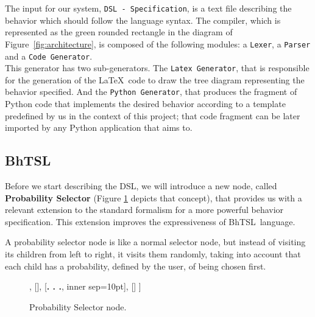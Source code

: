 \documentclass[a4paper,UKenglish,cleveref, autoref, thm-restate]{oasics-v2019}
\def\bht{BhTSL}
\begin{document}
The input for our system, \texttt{DSL - Specification}, is a text file describing the behavior which
should follow the language syntax.
The compiler, which is represented as the green rounded rectangle in the diagram of Figure~\ref{fig:architecture},
is composed of the following modules: a \texttt{Lexer}, a \texttt{Parser} and a \texttt{Code Generator}.\\
This generator has two sub-generators.
The \texttt{Latex Generator}, that is responsible for the generation of the \LaTeX\ code to draw
the tree diagram representing the behavior specified.
And the \texttt{Python Generator}, that produces the fragment of Python code that implements
the desired  behavior according to a template predefined by us in the context of this project;
that code fragment can be later imported by  any Python application that aims to.

\subsection{\bht}

Before we start describing the DSL, we will introduce a new node, called \textbf{Probability Selector}
(Figure \ref{fig:prob_selector} depicts that concept), that  provides us with a relevant extension to the standard
formalism for a more powerful  behavior specification.
This extension improves the expressiveness of \bht\ language.

A probability selector node is like a normal selector node, but instead of visiting its children from left to right,
it visits them randomly, taking into account that each child has a probability, defined by the user,
of being chosen first.

\begin{figure}[H]
    \centering
    \begin{behavior}
        [\probselector
            [\probnodeaction{$P_1$}{Child 1}],
            [],
            [{\textbf{. . .}}, inner sep=10pt],
            []
        ]
    \end{behavior}
    \caption{Probability Selector node.}
    \label{fig:prob_selector}
\end{figure}
\end{document}
